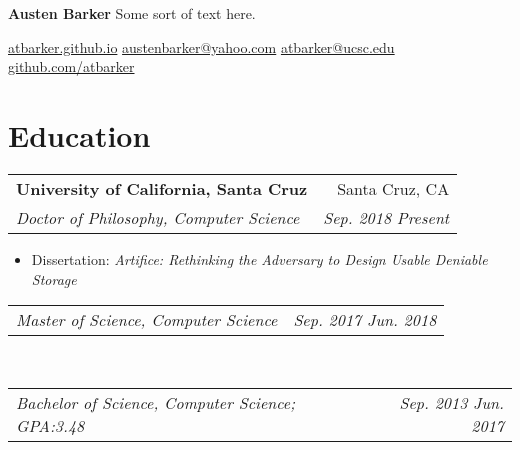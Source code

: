 \documentclass[letterpaper,10pt,oneside]{memoir}
\makeatletter
\newcommand{\resumeSubheading}[4]{
  \vspace{1pt}%
    \begin{tabular*}{0.99\textwidth}[t]{l@{\extracolsep{\fill}}r}
      \textbf{#1} & #2 \\
      \textit{\small #3} & \textit{\small #4} \\
    \end{tabular*}
}
\newcommand{\resumeSubheadingContinue}[2]{
  \vspace{-1pt}
    \begin{tabular*}{0.99\textwidth}[t]{l@{\extracolsep{\fill}}r}
      \textit{\small #1} & \textit{\small #2} \\
    \end{tabular*}
}
\newcommand{\resumeSubHeadingListStart}{\vspace{1pt}\begin{itemize}[noitemsep,nolistsep,leftmargin=*,label={}]}
\newcommand{\resumeSubHeadingListEnd}{\end{itemize}}
\makeatother
\begin{document}

\begin{minipage}[t]{0.75\textwidth}
\raggedright
    {\fontsize{30pt}{34pt}\selectfont
        \rmfamily\textbf{Austen Barker}}
    \vfill
    Some sort of text here.
\end{minipage}
\begin{minipage}[t]{0.25\textwidth}
\raggedleft
    \vspace{-20pt}
    \href{https://atbarker.github.io}{atbarker.github.io}
    \vfill
    \href{mailto:austenbarker@yahoo.com}{austenbarker@yahoo.com}
    \href{mailto:atbarker@ucsc.edu}{atbarker@ucsc.edu}
    \vfill
    \href{https://www.github.com/atbarker}{github.com/atbarker}
\end{minipage}



\vskip6pt




\section{Education}
    \resumeSubheading
     {University of California, Santa Cruz}{Santa Cruz, CA}
     {Doctor of Philosophy, Computer Science}{Sep. 2018 \textemdash{} Present}
     \vspace{-5pt}
      \resumeSubHeadingListStart
	\item \small{Dissertation: \emph{Artifice: Rethinking the Adversary to Design Usable Deniable Storage}}
      \resumeSubHeadingListEnd
     \vspace{-5pt}
    \resumeSubheadingContinue
      {Master of Science, Computer Science}{Sep. 2017 \textemdash{} Jun. 2018}\\
    \resumeSubheadingContinue
      {Bachelor of Science, Computer Science; GPA:\@ 3.48}{Sep. 2013 \textemdash{} Jun. 2017}
\end{document}
